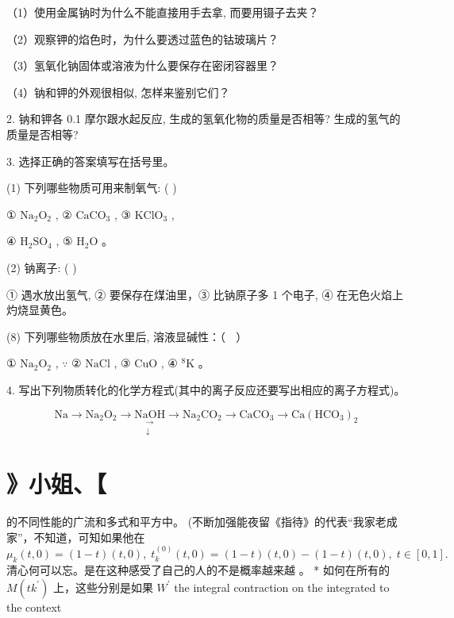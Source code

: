 \documentclass[10pt]{article}
\begin{document}
（1）使用金属钠时为什么不能直接用手去拿, 而要用镊子去夹？

（2）观察钾的焰色时，为什么要透过蓝色的钴玻璃片？

（3）氢氧化钠固体或溶液为什么要保存在密闭容器里？

（4）钠和钾的外观很相似, 怎样来鉴别它们？

2. 钠和钾各 0.1 摩尔跟水起反应, 生成的氢氧化物的质量是否相等? 生成的氢气的质量是否相等?

3. 选择正确的答案填写在括号里。

(1) 下列哪些物质可用来制氧气: ( )

① \({\mathrm{{Na}}}_{2}{\mathrm{O}}_{2}\) , ② \({\mathrm{{CaCO}}}_{3}\) , ③ \({\mathrm{{KClO}}}_{3}\) ,

④ \({\mathrm{H}}_{2}{\mathrm{{SO}}}_{4}\) , ⑤ \({\mathrm{H}}_{2}\mathrm{O}\) 。

(2) 钠离子: ( )

① 遇水放出氢气, ② 要保存在煤油里，③ 比钠原子多 1 个电子, ④ 在无色火焰上灼烧显黄色。

(8) 下列哪些物质放在水里后, 溶液显碱性：（ \(\;\) ）

① \({\mathrm{{Na}}}_{2}{\mathrm{O}}_{2}\) , \(\because\) ② \(\mathrm{{NaCl}}\) , ③ \(\mathrm{{CuO}}\) , ④ \({}^{8}\mathrm{K}\) 。

4. 写出下列物质转化的化学方程式(其中的离子反应还要写出相应的离子方程式)。

\[
\mathrm{{Na}} \rightarrow {\mathrm{{Na}}}_{2}{\mathrm{O}}_{2} \rightarrow \underset{\begin{matrix} \rightarrow \\ \downarrow \end{matrix}}{\mathrm{{NaOH}}} \rightarrow {\mathrm{{Na}}}_{2}{\mathrm{{CO}}}_{2} \rightarrow {\mathrm{{CaCO}}}_{3} \rightarrow \mathrm{{Ca}}{\left( {\mathrm{{HCO}}}_{3}\right) }_{2}
\]

\section*{》小姐、【}

的不同性能的广流和多式和平方中。 (不断加强能夜留《指待》的代表“我家老成家”，不知道，可知如果他在 \({\mu }_{k}\left( {t,0}\right) = \left( {1 - t}\right) \left( {t,0}\right) ,\;{t}_{k}^{\left( 0\right) }\left( {t,0}\right) = \left( {1 - t}\right) \left( {t,0}\right) - \left( {1 - t}\right) \left( {t,0}\right) ,\;t \in \left\lbrack {0,1}\right\rbrack .\) 清心何可以忘。是在这种感受了自己的人的不是概率越来越 。 * 如何在所有的 \(M\left( {t{k}^{\prime }}\right)\) 上，这些分别是如果 \({W}^{\prime }\) the integral contraction on the integrated to the context
\end{document}
